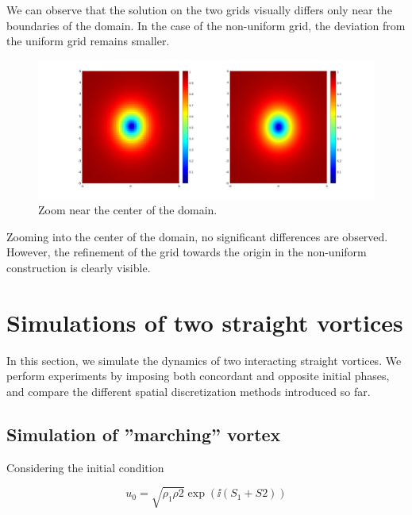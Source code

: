 We can observe that the solution on the two grids visually differs only near the boundaries of the domain. In the case of the non-uniform grid, the deviation from the uniform grid remains smaller.

\begin{figure}[h!]
    \centering
    \includegraphics[width=\textwidth]{img/comparison_unfd_5.pdf}
    \caption{Zoom near the center of the domain.}
\end{figure}

Zooming into the center of the domain, no significant differences are observed. However, the refinement of the grid towards the origin in the non-uniform construction is clearly visible.

\section{Simulations of two straight vortices}

In this section, we simulate the dynamics of two interacting straight vortices. We perform experiments by imposing both concordant and opposite initial phases, and compare the different spatial discretization methods introduced so far.

\subsection{Simulation of ''marching'' vortex}

Considering the initial condition 

\[u_0 = \sqrt{\rho_1 \rho2} \exp(\ii (S_1 + S2))\]






